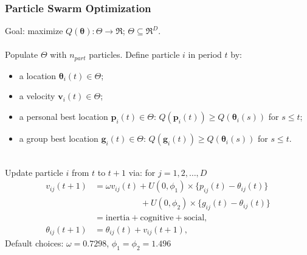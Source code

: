 \documentclass[xcolor=dvipsnames]{beamer}
\begin{document}
\begin{frame}
\frametitle{Particle Swarm Optimization}
Goal: maximize $Q(\bm{\theta}): \Theta \to \Re$; $\Theta \subseteq \Re^D$.\\~\\
Populate $\Theta$ with $n_{part}$ particles. Define particle $i$ in period $t$ by:
\begin{itemize}
\item a location $\bm{\theta}_i(t)\in \Theta$;
\item a velocity $\bm{v}_i(t) \in \Theta$;
\item a personal best location $\bm{p}_i(t) \in \Theta$: $Q(\bm{p}_i(t))\geq Q(\bm{\theta}_i(s))$ for $s\leq t$;
\item a group best location \hspace{0.28cm} $\bm{g}_i(t) \in \Theta$: $Q(\bm{g}_i(t))\geq Q(\bm{\theta}_i(s))$ for $s\leq t$.\\~\\
\end{itemize}
 Update particle $i$ from $t$ to $t+1$ via: for $j=1,2,\dots,D$
{\color{black}
\begin{align*}
v_{ij}(t+1) &= \omega v_{ij}(t) +  U(0,\phi_1)\times\{p_{ij}(t) - \theta_{ij}(t)\} \\
     &\;\phantom{= \omega v_{ij}(t)}+  U(0,\phi_2)\times\{g_{ij}(t) - \theta_{ij}(t)\}\\
& = \mbox{inertia} + \mbox{cognitive} + \mbox{social},\\
\theta_{ij}(t+1) &= \theta_{ij}(t) + v_{ij}(t+1),
\end{align*}}
Default choices: $\omega=0.7298$, $\phi_1=\phi_2=1.496$ \\
\ \ \ \ \ \citep{clerc2002particle,blum2008swarm}
\end{frame}
\end{document}
